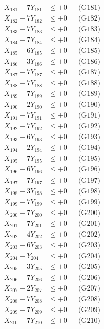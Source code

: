 \documentclass[a4paper,10pt]{article}
\begin{document}
{\begin{align}
X_{181} - 7Y_{181} &\leq +0 && \text{(G181)} \\
X_{182} - 7Y_{182} &\leq +0 && \text{(G182)} \\
X_{183} - 7Y_{183} &\leq +0 && \text{(G183)} \\
\allowbreak
X_{184} - 7Y_{184} &\leq +0 && \text{(G184)} \\
X_{185} - 6Y_{185} &\leq +0 && \text{(G185)} \\
X_{186} - 3Y_{186} &\leq +0 && \text{(G186)} \\
X_{187} - 7Y_{187} &\leq +0 && \text{(G187)} \\
X_{188} - 7Y_{188} &\leq +0 && \text{(G188)} \\
X_{189} - 7Y_{189} &\leq +0 && \text{(G189)} \\
X_{190} - 2Y_{190} &\leq +0 && \text{(G190)} \\
X_{191} - 7Y_{191} &\leq +0 && \text{(G191)} \\
X_{192} - 7Y_{192} &\leq +0 && \text{(G192)} \\
X_{193} - 6Y_{193} &\leq +0 && \text{(G193)} \\
\allowbreak
X_{194} - 2Y_{194} &\leq +0 && \text{(G194)} \\
X_{195} - 7Y_{195} &\leq +0 && \text{(G195)} \\
X_{196} - 6Y_{196} &\leq +0 && \text{(G196)} \\
X_{197} - 7Y_{197} &\leq +0 && \text{(G197)} \\
X_{198} - 3Y_{198} &\leq +0 && \text{(G198)} \\
X_{199} - 7Y_{199} &\leq +0 && \text{(G199)} \\
X_{200} - 7Y_{200} &\leq +0 && \text{(G200)} \\
X_{201} - 7Y_{201} &\leq +0 && \text{(G201)} \\
X_{202} - 4Y_{202} &\leq +0 && \text{(G202)} \\
X_{203} - 6Y_{203} &\leq +0 && \text{(G203)} \\
\allowbreak
X_{204} - Y_{204} &\leq +0 && \text{(G204)} \\
X_{205} - 3Y_{205} &\leq +0 && \text{(G205)} \\
X_{206} - 7Y_{206} &\leq +0 && \text{(G206)} \\
X_{207} - 2Y_{207} &\leq +0 && \text{(G207)} \\
X_{208} - 7Y_{208} &\leq +0 && \text{(G208)} \\
X_{209} - 7Y_{209} &\leq +0 && \text{(G209)} \\
X_{210} - 7Y_{210} &\leq +0 && \text{(G210)} \\

\end{align}}
\end{document}
